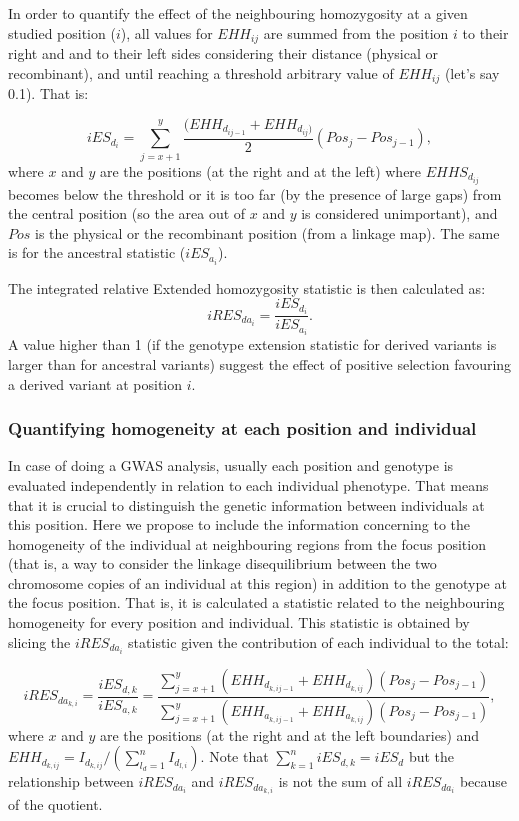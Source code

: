 \documentclass[a4paper,11pt]{article}
\begin{document}
In order to quantify the effect of the neighbouring homozygosity at a given studied position ($i$),  all values for $EHH_{ij}$ are summed from the position $i$ to their right and and to their left sides considering their distance (physical or recombinant), and until reaching a threshold arbitrary value of $EHH_{ij}$ (let's say 0.1). That is: 

\begin{equation}
 iES_{d_i} = \sum_{j=x+1}^{y}\frac{(EHH_{d_{ij-1}} + EHH_{d_{ij})}}{2} (Pos_{j} - Pos_{j-1}),
 \end{equation}
where $x$ and $y$ are the positions (at the right and at the left) where $EHHS_{d_{ij}}$ becomes below the threshold or it is too far (by the presence of large gaps) from the central position (so the area out of $x$ and $y$ is considered unimportant), and $Pos$ is the physical or the recombinant position (from a linkage map). The same is for the ancestral statistic ($iES_{a_i}$).

The integrated relative Extended homozygosity statistic is then calculated as:
 \begin{equation}
 iRES_{da_{i}} = \frac{iES_{d_{i}}} {iES_{a_{i}}}.
 \end{equation}
A value higher than 1 (if the genotype extension statistic for derived variants is larger than for ancestral variants) suggest the effect of positive selection favouring a derived variant at position $i$.  

\subsubsection{Quantifying homogeneity at each position and individual}
In case of doing a GWAS analysis, usually each position and genotype is evaluated independently in relation to each individual phenotype. That means that it is crucial to distinguish the genetic information between individuals at this position. Here we propose to include the information concerning to the homogeneity of the individual at neighbouring regions from the focus position (that is, a way to consider the linkage disequilibrium between the two chromosome copies of an individual at this region) in addition to the genotype at the focus position. That is, it is calculated a statistic related to the neighbouring homogeneity for every position and individual. This statistic is obtained by slicing the $iRES_{da_i}$ statistic given the contribution of each individual to the total:

 \begin{equation}
 iRES_{da_{k,i}} =  \frac{iES_{d,k}}{iES_{a,k}} = \frac{\sum_{j=x+1}^{y}(EHH_{d_{k,ij-1}}+ EHH_{d_{k,ij}})(Pos_{j} - Pos_{j-1})}  {\sum_{j=x+1}^{y}(EHH_{a_{k,ij-1}}+ EHH_{a_{k,ij}})(Pos_{j} - Pos_{j-1})},
 \end{equation}
where $x$ and $y$ are the positions (at the right and at the left boundaries) and $EHH_{d_{k,ij}} = I_{d_{k,ij}} / (\sum_{l_d=1}^{n}I_{d_{l,i}})$. Note that $\sum_{k=1}^{n}iES_{d,k}=iES_d$ but the relationship between $iRES_{da_{i}}$ and $iRES_{da_{k,i}}$ is not the sum of all $iRES_{da_i}$ because of the quotient.
\end{document}
